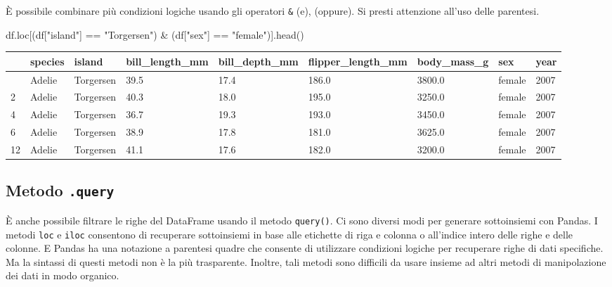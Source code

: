 \documentclass[
  letterpaper,
  krantz2]{{[}./krantz{]}}
\newenvironment{Shaded}{\begin{snugshade}}{\end{snugshade}}
\newcommand{\NormalTok}[1]{\textcolor[rgb]{0.00,0.23,0.31}{#1}}
\newcommand{\OperatorTok}[1]{\textcolor[rgb]{0.37,0.37,0.37}{#1}}
\newcommand{\StringTok}[1]{\textcolor[rgb]{0.13,0.47,0.30}{#1}}
\begin{document}
È possibile combinare più condizioni logiche usando gli operatori
\texttt{\&} (e), \texttt{\textbar{}} (oppure). Si presti attenzione
all'uso delle parentesi.

\begin{Shaded}
\begin{Highlighting}[]
\NormalTok{df.loc[(df[}\StringTok{"island"}\NormalTok{] }\OperatorTok{==} \StringTok{"Torgersen"}\NormalTok{) }\OperatorTok{\&}\NormalTok{ (df[}\StringTok{"sex"}\NormalTok{] }\OperatorTok{==} \StringTok{"female"}\NormalTok{)].head()}
\end{Highlighting}
\end{Shaded}

\begin{longtable}[]{@{}lllllllll@{}}
\toprule\noalign{}
& species & island & bill\_length\_mm & bill\_depth\_mm &
flipper\_length\_mm & body\_mass\_g & sex & year \\
\midrule\noalign{}
\endhead
\bottomrule\noalign{}
\endlastfoot
1 & Adelie & Torgersen & 39.5 & 17.4 & 186.0 & 3800.0 & female & 2007 \\
2 & Adelie & Torgersen & 40.3 & 18.0 & 195.0 & 3250.0 & female & 2007 \\
4 & Adelie & Torgersen & 36.7 & 19.3 & 193.0 & 3450.0 & female & 2007 \\
6 & Adelie & Torgersen & 38.9 & 17.8 & 181.0 & 3625.0 & female & 2007 \\
12 & Adelie & Torgersen & 41.1 & 17.6 & 182.0 & 3200.0 & female &
2007 \\
\end{longtable}

\subsection{\texorpdfstring{Metodo
\texttt{.query}}{Metodo .query}}\label{metodo-.query}

È anche possibile filtrare le righe del DataFrame usando il metodo
\texttt{query()}. Ci sono diversi modi per generare sottoinsiemi con
Pandas. I metodi \texttt{loc} e \texttt{iloc} consentono di recuperare
sottoinsiemi in base alle etichette di riga e colonna o all'indice
intero delle righe e delle colonne. E Pandas ha una notazione a
parentesi quadre che consente di utilizzare condizioni logiche per
recuperare righe di dati specifiche. Ma la sintassi di questi metodi non
è la più trasparente. Inoltre, tali metodi sono difficili da usare
insieme ad altri metodi di manipolazione dei dati in modo organico.
\end{document}
